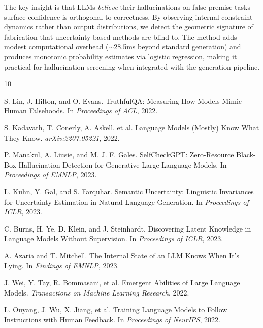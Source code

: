 \documentclass[11pt]{article}
\begin{document}
The key insight is that LLMs \textit{believe} their hallucinations on false-premise tasks---surface confidence is orthogonal to correctness. By observing internal constraint dynamics rather than output distributions, we detect the geometric signature of fabrication that uncertainty-based methods are blind to. The method adds modest computational overhead ($\sim$28.5ms beyond standard generation) and produces monotonic probability estimates via logistic regression, making it practical for hallucination screening when integrated with the generation pipeline.

\begin{thebibliography}{10}

S. Lin, J. Hilton, and O. Evans.
\newblock TruthfulQA: Measuring How Models Mimic Human Falsehoods.
\newblock In \textit{Proceedings of ACL}, 2022.

S. Kadavath, T. Conerly, A. Askell, et al.
\newblock Language Models (Mostly) Know What They Know.
\newblock \textit{arXiv:2207.05221}, 2022.

P. Manakul, A. Liusie, and M. J. F. Gales.
\newblock SelfCheckGPT: Zero-Resource Black-Box Hallucination Detection for Generative Large Language Models.
\newblock In \textit{Proceedings of EMNLP}, 2023.

L. Kuhn, Y. Gal, and S. Farquhar.
\newblock Semantic Uncertainty: Linguistic Invariances for Uncertainty Estimation in Natural Language Generation.
\newblock In \textit{Proceedings of ICLR}, 2023.

C. Burns, H. Ye, D. Klein, and J. Steinhardt.
\newblock Discovering Latent Knowledge in Language Models Without Supervision.
\newblock In \textit{Proceedings of ICLR}, 2023.

A. Azaria and T. Mitchell.
\newblock The Internal State of an LLM Knows When It's Lying.
\newblock In \textit{Findings of EMNLP}, 2023.

J. Wei, Y. Tay, R. Bommasani, et al.
\newblock Emergent Abilities of Large Language Models.
\newblock \textit{Transactions on Machine Learning Research}, 2022.

L. Ouyang, J. Wu, X. Jiang, et al.
\newblock Training Language Models to Follow Instructions with Human Feedback.
\newblock In \textit{Proceedings of NeurIPS}, 2022.

\end{thebibliography}
\end{document}
